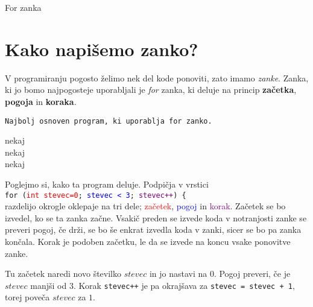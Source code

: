 
For zanka


\section{Kako napišemo zanko?}

V programiranju pogosto želimo nek del kode ponoviti, zato imamo \emph{zanke}.
Zanka, ki jo bomo najpogosteje uporabljali je \emph{for} zanka,
ki deluje na princip \textbf{začetka}, \textbf{pogoja} in \textbf{koraka}.
\begin{examples}
\verb+Najbolj osnoven program, ki uporablja for zanko.+


\begin{inout}
	nekaj \\
	nekaj \\
	nekaj
\end{inout}

\end{examples}

Poglejmo si, kako ta program deluje. Podpičja v vrstici \\
\texttt{for~({\textcolor{red}{int~stevec=0}};~\textcolor{blue}{stevec~<~3};~\textcolor{purple}{stevec++})~\{} \\
razdelijo okrogle oklepaje na tri dele; \textcolor{red}{začetek},
\textcolor{blue}{pogoj} in \textcolor{purple}{korak}.
Začetek se bo izvedel, ko se ta zanka začne. Vsakič preden se izvede koda
v notranjosti zanke se preveri pogoj, če drži,
se bo še enkrat izvedla koda v zanki, sicer se bo pa zanka končala.
Korak je podoben začetku, le da se izvede na koncu vsake ponovitve zanke.

Tu začetek naredi novo številko $stevec$ in jo nastavi na $0$.
Pogoj preveri, če je $stevec$ manjši od $3$. Korak \texttt{stevec++} je pa
okrajšava za \texttt{stevec = stevec + 1}, torej poveča $stevec$ za $1$.

